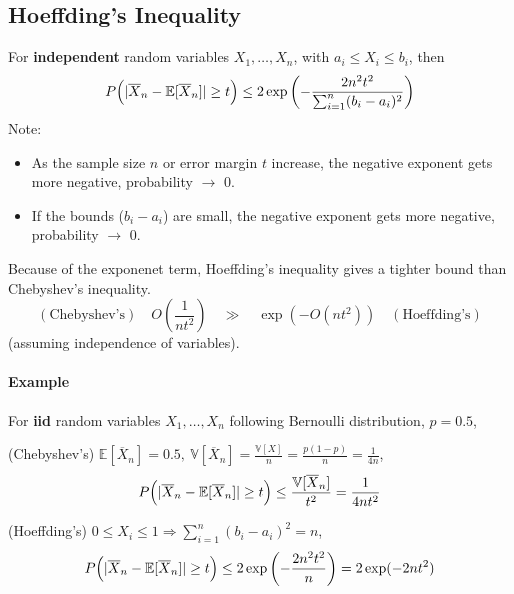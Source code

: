 \documentclass[../Probability.tex]{subfiles}
\begin{document}
\subsection{Hoeffding's Inequality}
For \textbf{independent} random variables $X_1, \ldots, X_n$, with $a_i \leq X_i \leq b_i$, then
\[P \Bigl(|\overline{X}_n - \mathbb{E}[\overline{X}_n]| \geq t \Bigr) \leq 2\exp \left(-\frac{2n^2t^2}{\sum_{i=1}^n(b_i - a_i)^2}\right)\]
Note:
\begin{itemize}
    \item As the sample size $n$ or error margin $t$ increase, the negative exponent gets more negative, probability $\rightarrow$ 0.
    \item If the bounds ($b_i - a_i$) are small, the negative exponent gets more negative, probability $\rightarrow$ 0.
\end{itemize}
\noindent Because of the exponenet term, Hoeffding's inequality gives a tighter bound than Chebyshev's inequality.
\[(\text{Chebyshev's}) \quad O(\frac{1}{nt^2}) \quad \gg \quad \exp(-O(nt^2)) \quad (\text{Hoeffding's}) \]
(assuming independence of variables).

\paragraph{Example} For \textbf{iid} random variables $X_1,\ldots,X_n$ following Bernoulli distribution, $p = 0.5$,

\smallskip
\noindent (Chebyshev's) $\mathbb{E}[\overline{X}_n] = 0.5,\: \mathbb{V}[\overline{X}_n] = \frac{\mathbb{V}[X]}{n} = \frac{p(1-p)}{n} = \frac{1}{4n}$,
\[P\Bigl(|\overline{X}_n - \mathbb{E}[\overline{X}_n]|\geq t \Bigr) \leq \frac{\mathbb{V}[\overline{X}_n]}{t^2} = \frac{1}{4nt^2}\]

\noindent (Hoeffding's) $0\leq X_i \leq 1 \Rightarrow \sum_{i=1}^n(b_i - a_i)^2 = n$,
\[P\Bigl(|\overline{X}_n - \mathbb{E}[\overline{X}_n]| \geq t\Bigr) \leq 2\exp\left(-\frac{2n^2t^2}{n}\right) = 2\exp(-2nt^2)\]
\end{document}
